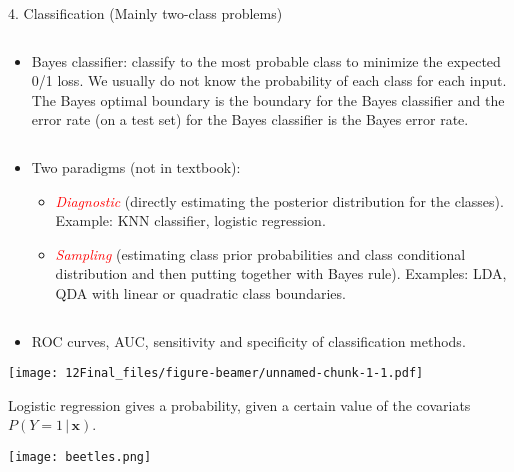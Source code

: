\documentclass[10pt,ignorenonframetext,]{beamer}
\providecommand{\tightlist}{%
  \setlength{\itemsep}{0pt}\setlength{\parskip}{0pt}}
\begin{document}
\begin{frame}

\begin{block}{4. Classification (Mainly two-class problems)}

\(~\)

\begin{itemize}
\tightlist
\item
  Bayes classifier: classify to the most probable class to minimize the
  expected 0/1 loss. We usually do not know the probability of each
  class for each input. The Bayes optimal boundary is the boundary for
  the Bayes classifier and the error rate (on a test set) for the Bayes
  classifier is the Bayes error rate.
\end{itemize}

\(~\)

\begin{itemize}
\tightlist
\item
  Two paradigms (not in textbook):

  \begin{itemize}
  \tightlist
  \item
    \emph{\textcolor{red}{Diagnostic}} (directly estimating the
    posterior distribution for the classes). Example: KNN classifier,
    logistic regression.
  \item
    \emph{\textcolor{red}{Sampling}} (estimating class prior
    probabilities and class conditional distribution and then putting
    together with Bayes rule). Examples: LDA, QDA with linear or
    quadratic class boundaries.
  \end{itemize}
\end{itemize}

\(~\)

\begin{itemize}
\tightlist
\item
  ROC curves, AUC, sensitivity and specificity of classification
  methods.
\end{itemize}

\end{block}

\end{frame}

\begin{frame}

\texttt{[image: 12Final\_files/figure-beamer/unnamed-chunk-1-1.pdf]}

\end{frame}

\begin{frame}

Logistic regression gives a probability, given a certain value of the
covariats \(P(Y=1 \, | \, \boldsymbol{x})\).

\texttt{[image: beetles.png]}

\end{frame}
\end{document}
